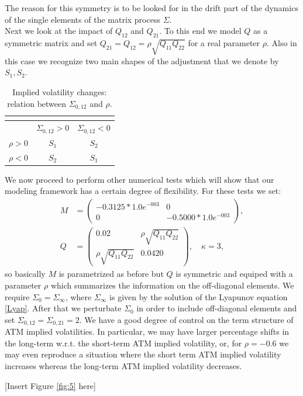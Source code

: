 The reason for this symmetry is to be looked for in the drift part of the dynamics of the single elements of the matrix process $\Sigma$.\\

Next we look at the impact of $Q_{12}$ and $Q_{21}$. To this end we model $Q$ as a symmetric matrix and set $Q_{21}=Q_{12}=\rho\sqrt{Q_{11}Q_{22}}$ for a real parameter $\rho$. Also in this case we recognize two main shapes of the adjustment that we denote by $S_1,S_2$.

\begin{table}[h]
\centering
	\begin{tabular}{ccc}
\multicolumn{3}{c}{  } \\ \hline
	 &$\Sigma_{0,12}>0$&$\Sigma_{0,12}<0$\\ \hline \hline
	 $\rho>0$&$S_1$&$S_2$\\ \hline
	 $\rho<0$&$S_2$&$S_1$\\ \hline
	\end{tabular}
	\caption{Implied volatility changes: relation between $\Sigma_{0,12}$ and $\rho$.}
	\label{tab:ImpliedVolatilityChanges_rho}
\end{table}

We now proceed to perform other numerical tests which will show that our modeling framework has a certain degree of flexibility. For these tests we set:
\begin{align}
M&=\left(\begin{array}{cc} -0.3125*1.0e^{-003} &0\\ 0& -0.5000*1.0e^{-003} \end{array}\right),\nonumber\\
Q&=\left(\begin{array}{cc} 0.02&\rho \sqrt{Q_{11}Q_{22}}\\ \rho \sqrt{Q_{11}Q_{22}}&0.0420\end{array}\right),\quad \kappa=3,\nonumber
\end{align}
so basically $M$ is parametrized  as before but $Q$ is symmetric and equiped with a parameter $\rho$ which summarizes the information on the off-diagonal elements. We require $\Sigma_0=\Sigma_\infty$, where $\Sigma_\infty$ is given by the solution of the Lyapunov equation \eqref{Lyap}. After that we perturbate $\Sigma_0$ in order to include off-diagonal elements and set $\Sigma_{0,12}=\Sigma_{0,21}=2$.
We have a good degree of control on the term structure of ATM implied volatilities. In particular, we may have larger percentage shifts in the long-term w.r.t. the short-term ATM implied volatility, or, for $\rho=-0.6$ we may even reproduce a situation where the short term ATM implied volatility increases whereas the long-term ATM implied volatility decreases.
\begin{center}
[Insert Figure \ref{fig:5}  here]
\end{center}

